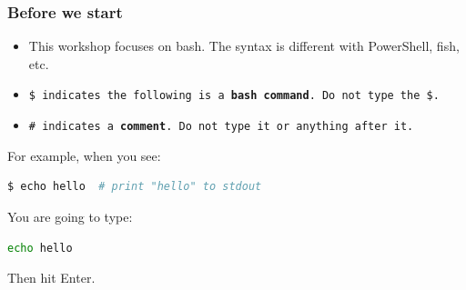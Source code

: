 \begin{frame}[fragile]
\frametitle{Before we start}
\begin{itemize}
    \item This workshop focuses on bash. The syntax is different with PowerShell, fish, etc. 
    \item \tt{\$} indicates the following is a \textbf{bash command}.
        Do not type the \tt{\$}.
    \item \tt{\#} indicates a \textbf{comment}.
        Do not type it or anything after it.
\end{itemize}
For example, when you see:
\begin{lstlisting}[language=bash]
$ echo hello  # print "hello" to stdout
\end{lstlisting}
You are going to type:
\begin{lstlisting}[language=bash]
echo hello
\end{lstlisting}
Then hit Enter. 
\end{frame}
